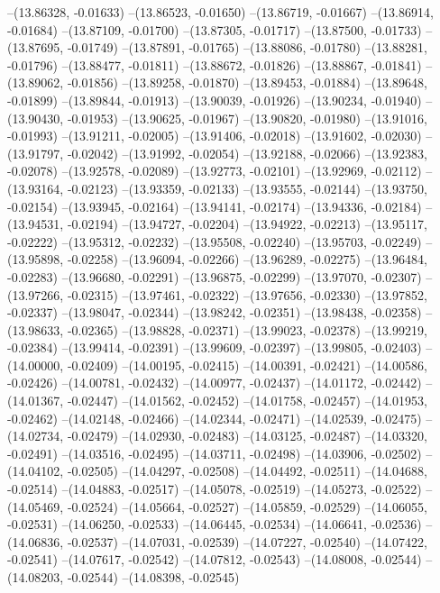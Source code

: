 --(13.86328, -0.01633)
--(13.86523, -0.01650)
--(13.86719, -0.01667)
--(13.86914, -0.01684)
--(13.87109, -0.01700)
--(13.87305, -0.01717)
--(13.87500, -0.01733)
--(13.87695, -0.01749)
--(13.87891, -0.01765)
--(13.88086, -0.01780)
--(13.88281, -0.01796)
--(13.88477, -0.01811)
--(13.88672, -0.01826)
--(13.88867, -0.01841)
--(13.89062, -0.01856)
--(13.89258, -0.01870)
--(13.89453, -0.01884)
--(13.89648, -0.01899)
--(13.89844, -0.01913)
--(13.90039, -0.01926)
--(13.90234, -0.01940)
--(13.90430, -0.01953)
--(13.90625, -0.01967)
--(13.90820, -0.01980)
--(13.91016, -0.01993)
--(13.91211, -0.02005)
--(13.91406, -0.02018)
--(13.91602, -0.02030)
--(13.91797, -0.02042)
--(13.91992, -0.02054)
--(13.92188, -0.02066)
--(13.92383, -0.02078)
--(13.92578, -0.02089)
--(13.92773, -0.02101)
--(13.92969, -0.02112)
--(13.93164, -0.02123)
--(13.93359, -0.02133)
--(13.93555, -0.02144)
--(13.93750, -0.02154)
--(13.93945, -0.02164)
--(13.94141, -0.02174)
--(13.94336, -0.02184)
--(13.94531, -0.02194)
--(13.94727, -0.02204)
--(13.94922, -0.02213)
--(13.95117, -0.02222)
--(13.95312, -0.02232)
--(13.95508, -0.02240)
--(13.95703, -0.02249)
--(13.95898, -0.02258)
--(13.96094, -0.02266)
--(13.96289, -0.02275)
--(13.96484, -0.02283)
--(13.96680, -0.02291)
--(13.96875, -0.02299)
--(13.97070, -0.02307)
--(13.97266, -0.02315)
--(13.97461, -0.02322)
--(13.97656, -0.02330)
--(13.97852, -0.02337)
--(13.98047, -0.02344)
--(13.98242, -0.02351)
--(13.98438, -0.02358)
--(13.98633, -0.02365)
--(13.98828, -0.02371)
--(13.99023, -0.02378)
--(13.99219, -0.02384)
--(13.99414, -0.02391)
--(13.99609, -0.02397)
--(13.99805, -0.02403)
--(14.00000, -0.02409)
--(14.00195, -0.02415)
--(14.00391, -0.02421)
--(14.00586, -0.02426)
--(14.00781, -0.02432)
--(14.00977, -0.02437)
--(14.01172, -0.02442)
--(14.01367, -0.02447)
--(14.01562, -0.02452)
--(14.01758, -0.02457)
--(14.01953, -0.02462)
--(14.02148, -0.02466)
--(14.02344, -0.02471)
--(14.02539, -0.02475)
--(14.02734, -0.02479)
--(14.02930, -0.02483)
--(14.03125, -0.02487)
--(14.03320, -0.02491)
--(14.03516, -0.02495)
--(14.03711, -0.02498)
--(14.03906, -0.02502)
--(14.04102, -0.02505)
--(14.04297, -0.02508)
--(14.04492, -0.02511)
--(14.04688, -0.02514)
--(14.04883, -0.02517)
--(14.05078, -0.02519)
--(14.05273, -0.02522)
--(14.05469, -0.02524)
--(14.05664, -0.02527)
--(14.05859, -0.02529)
--(14.06055, -0.02531)
--(14.06250, -0.02533)
--(14.06445, -0.02534)
--(14.06641, -0.02536)
--(14.06836, -0.02537)
--(14.07031, -0.02539)
--(14.07227, -0.02540)
--(14.07422, -0.02541)
--(14.07617, -0.02542)
--(14.07812, -0.02543)
--(14.08008, -0.02544)
--(14.08203, -0.02544)
--(14.08398, -0.02545)

